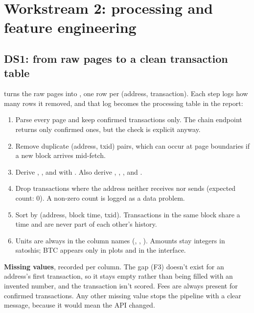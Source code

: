\section{Workstream 2: processing and feature engineering}
\label{sec:processing}

\subsection{DS1: from raw pages to a clean transaction table}

 turns the raw pages into
, one row per (address, transaction). Each step logs
how many rows it removed, and that log becomes the processing table in the report:

\begin{enumerate}
  \item Parse every page and keep confirmed transactions only. The chain endpoint returns only
    confirmed ones, but the check is explicit anyway.
  \item Remove duplicate (address, txid) pairs, which can occur at page boundaries if a new block
    arrives mid-fetch.
  \item Derive , ,  and  with
    . Also derive , , ,
     and .
  \item Drop transactions where the address neither receives nor sends (expected count: 0).
    A non-zero count is logged as a data problem.
  \item Sort by (address, block time, txid). Transactions in the same block share a time and are
    never part of each other's history.
  \item Units are always in the column names (, , ). Amounts
    stay integers in satoshis; BTC appears only in plots and in the interface.
\end{enumerate}

\textbf{Missing values}, recorded per column. The gap (F3) doesn't exist for an address's first
transaction, so it stays empty rather than being filled with an invented number, and the
transaction isn't scored. Fees are always present for confirmed transactions. Any other missing
value stops the pipeline with a clear message, because it would mean the API changed.

